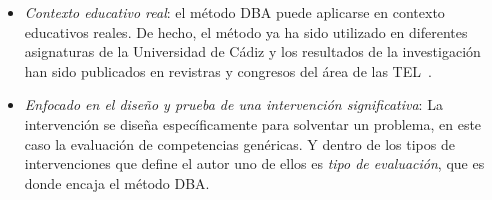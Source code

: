 \begin{itemize}
\item \emph{Contexto educativo real}: el método DBA puede aplicarse en contexto educativos reales. De hecho, el método ya ha sido utilizado en diferentes asignaturas de la Universidad de Cádiz y los resultados de la investigación han sido publicados en revistras y congresos del área de las TEL~\cite{Balderas:2012,Balderas:2013,balderas2013generative,Balderas:2015,balderas2015domain}.
\item \emph{Enfocado en el diseño y prueba de una intervención significativa}: La intervención se diseña específicamente para solventar un problema, en este caso la evaluación de competencias genéricas. Y dentro de los tipos de intervenciones que define el autor uno de ellos es \emph{tipo de evaluación}, que es donde encaja el método DBA.


\end{itemize}
